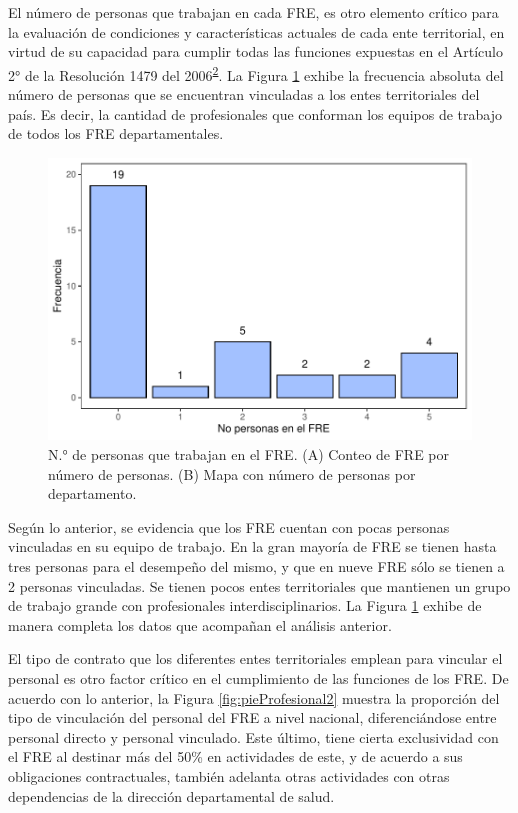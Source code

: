 \documentclass[
]{book}
\begin{document}
El número de personas que trabajan en cada FRE, es otro elemento crítico para la evaluación de condiciones y características actuales de cada ente territorial, en virtud de su capacidad para cumplir todas las funciones expuestas en el Artículo 2° de la Resolución 1479 del 2006\textsuperscript{\protect\hyperlink{ref-MSPS1479-2006}{2}}. La Figura \ref{fig:perfilProfesional3} exhibe la frecuencia absoluta del número de personas que se encuentran vinculadas a los entes territoriales del país. Es decir, la cantidad de profesionales que conforman los equipos de trabajo de todos los FRE departamentales.

\begin{figure}[b!]

{\centering \includegraphics[width=1\linewidth]{InformeFinal_files/figure-latex/perfilProfesional3-1} 

}

\caption{N.° de personas que trabajan en el FRE. (A) Conteo de FRE por número de personas. (B) Mapa con número de personas por departamento.}\label{fig:perfilProfesional3}
\end{figure}

Según lo anterior, se evidencia que los FRE cuentan con pocas personas vinculadas en su equipo de trabajo. En la gran mayoría de FRE se tienen hasta tres personas para el desempeño del mismo, y que en nueve FRE sólo se tienen a 2 personas vinculadas. Se tienen pocos entes territoriales que mantienen un grupo de trabajo grande con profesionales interdisciplinarios. La Figura \ref{fig:perfilProfesional3} exhibe de manera completa los datos que acompañan el análisis anterior.

El tipo de contrato que los diferentes entes territoriales emplean para vincular el personal es otro factor crítico en el cumplimiento de las funciones de los FRE. De acuerdo con lo anterior, la Figura \ref{fig:pieProfesional2} muestra la proporción del tipo de vinculación del personal del FRE a nivel nacional, diferenciándose entre personal directo y personal vinculado. Este último, tiene cierta exclusividad con el FRE al destinar más del 50\% en actividades de este, y de acuerdo a sus obligaciones contractuales, también adelanta otras actividades con otras dependencias de la dirección departamental de salud.
\end{document}

